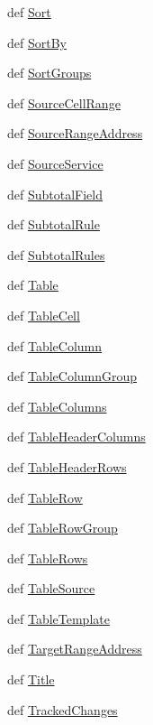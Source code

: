 \begin{DoxyCompactItemize}
\item 
def \hyperlink{namespaceodf_1_1table_a40b6828068e14e79eda2517e1c8d94c0}{Sort}
\item 
def \hyperlink{namespaceodf_1_1table_a819ae10fa9ec32292e7819f2edef8f02}{Sort\+By}
\item 
def \hyperlink{namespaceodf_1_1table_adb481df1c0ddb4f537a4977e59f30382}{Sort\+Groups}
\item 
def \hyperlink{namespaceodf_1_1table_a7c79a4976834bbb835b2411acd0e2c72}{Source\+Cell\+Range}
\item 
def \hyperlink{namespaceodf_1_1table_a39bdd790598f9f71c4b318b15b08f483}{Source\+Range\+Address}
\item 
def \hyperlink{namespaceodf_1_1table_a642a2f2cd1a42cd41947062d7f8b2122}{Source\+Service}
\item 
def \hyperlink{namespaceodf_1_1table_a39daf12b8ff039e489f73de7ec942650}{Subtotal\+Field}
\item 
def \hyperlink{namespaceodf_1_1table_ab785b9c62476cb964dd956c0fbdcb68b}{Subtotal\+Rule}
\item 
def \hyperlink{namespaceodf_1_1table_ac27e0a2850ca6af2e413ffb4c4fe5dc2}{Subtotal\+Rules}
\item 
def \hyperlink{namespaceodf_1_1table_a6b5b03ead2be0832cfdf43fed74a7f9a}{Table}
\item 
def \hyperlink{namespaceodf_1_1table_a64deafd0b085e8653de359f6bd0c480f}{Table\+Cell}
\item 
def \hyperlink{namespaceodf_1_1table_aafd910c01aa5e615adda3f77444752b9}{Table\+Column}
\item 
def \hyperlink{namespaceodf_1_1table_a5835bca2816f2b64d52299b377979600}{Table\+Column\+Group}
\item 
def \hyperlink{namespaceodf_1_1table_a7d779b9b60ebf6e2a7eaa1c7d88c3f51}{Table\+Columns}
\item 
def \hyperlink{namespaceodf_1_1table_adab8436cd6eed04e0ac0f25c0d13407e}{Table\+Header\+Columns}
\item 
def \hyperlink{namespaceodf_1_1table_a1bbfda8a0f6240c7224a2190e8136176}{Table\+Header\+Rows}
\item 
def \hyperlink{namespaceodf_1_1table_a429d19b0e2006a828567d94b6a6e91d6}{Table\+Row}
\item 
def \hyperlink{namespaceodf_1_1table_ac1d637f0e13f23da08cfeb9b71dd48c4}{Table\+Row\+Group}
\item 
def \hyperlink{namespaceodf_1_1table_a9537dae9122e15eb486bbf44f53336b8}{Table\+Rows}
\item 
def \hyperlink{namespaceodf_1_1table_ad1889eded92dffb4b47914be910d8684}{Table\+Source}
\item 
def \hyperlink{namespaceodf_1_1table_a74b60f484963c44d6528152dc7f49805}{Table\+Template}
\item 
def \hyperlink{namespaceodf_1_1table_a0dd76f73dc50e5ca61221381addacc5b}{Target\+Range\+Address}
\item 
def \hyperlink{namespaceodf_1_1table_a349d47e1e7c9e21d08f5da5d486ca145}{Title}
\item 
def \hyperlink{namespaceodf_1_1table_ae8e2406bfb8e7ccb88c14aef53f79191}{Tracked\+Changes}
\end{DoxyCompactItemize}


